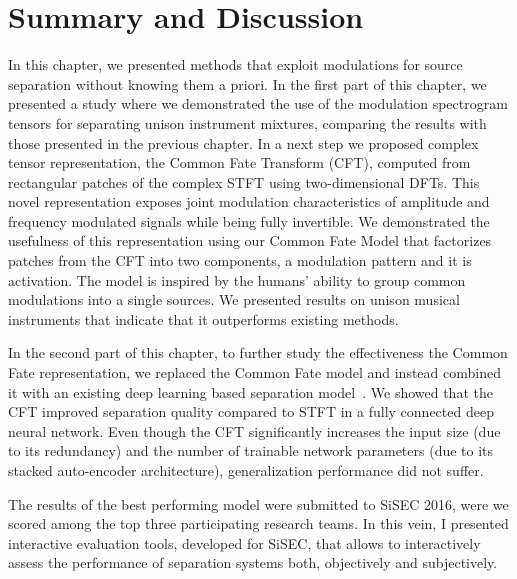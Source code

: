 \section{Summary and Discussion}


In this chapter, we presented methods that exploit modulations for source separation without knowing them a priori. 
In the first part of this chapter, we presented a study where we demonstrated the use of the modulation spectrogram tensors for separating unison instrument mixtures, comparing the results with those presented in the previous chapter.
In a next step we proposed complex tensor representation, the Common Fate Transform (CFT), computed from rectangular patches of the complex STFT using two-dimensional DFTs.
This novel representation exposes joint modulation characteristics of amplitude and frequency modulated signals while being fully invertible.
We demonstrated the usefulness of this representation using our Common Fate Model that factorizes patches from the CFT into two components, a modulation pattern and it is activation. 
The model is inspired by the humans' ability to group common modulations into a single sources.
We presented results on unison musical instruments that indicate that it outperforms existing methods.
\par
In the second part of this chapter, to further study the effectiveness the Common Fate representation, we replaced the Common Fate model and instead combined it with an existing deep learning based separation model~\cite{uhlich15}.
We showed that the CFT improved separation quality compared to STFT in a fully connected deep neural network.
Even though the CFT significantly increases the input size (due to its redundancy) and the number of trainable network parameters (due to its stacked auto-encoder architecture), generalization performance did not suffer.
\par
The results of the best performing model were submitted to SiSEC 2016, were we scored among the top three participating research teams.
In this vein, I presented interactive evaluation tools, developed for SiSEC, that allows to interactively assess the performance of separation systems both, objectively and subjectively.

